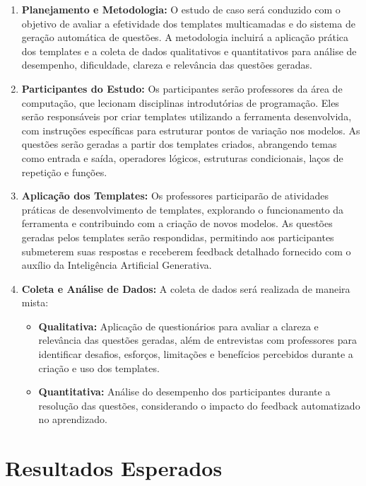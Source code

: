 \begin{enumerate}[label=\textbf{\alph*)}]
    \item \textbf{Planejamento e Metodologia:}  
    O estudo de caso será conduzido com o objetivo de avaliar a efetividade dos templates multicamadas e do sistema de geração automática de questões. A metodologia incluirá a aplicação prática dos templates e a coleta de dados qualitativos e quantitativos para análise de desempenho, dificuldade, clareza e relevância das questões geradas. 

    \item \textbf{Participantes do Estudo:}  
    Os participantes serão professores da área de computação, que lecionam disciplinas introdutórias de programação. Eles serão responsáveis por criar templates utilizando a ferramenta desenvolvida, com instruções específicas para estruturar pontos de variação nos modelos. As questões serão geradas a partir dos templates criados, abrangendo temas como entrada e saída, operadores lógicos, estruturas condicionais, laços de repetição e funções.

    \item \textbf{Aplicação dos Templates:}  
    Os professores participarão de atividades práticas de desenvolvimento de templates, explorando o funcionamento da ferramenta e contribuindo com a criação de novos modelos. As questões geradas pelos templates serão respondidas, permitindo aos participantes submeterem suas respostas e receberem feedback detalhado fornecido com o auxílio da Inteligência Artificial Generativa.

    \item \textbf{Coleta e Análise de Dados:}  
    A coleta de dados será realizada de maneira mista:
    \begin{itemize}
        \item \textbf{Qualitativa:} Aplicação de questionários para avaliar a clareza e relevância das questões geradas, além de entrevistas com professores para identificar desafios, esforços, limitações e benefícios percebidos durante a criação e uso dos templates.
        \item \textbf{Quantitativa:} Análise do desempenho dos participantes durante a resolução das questões, considerando o impacto do feedback automatizado no aprendizado.
    \end{itemize}
\end{enumerate}


\section{Resultados Esperados}

